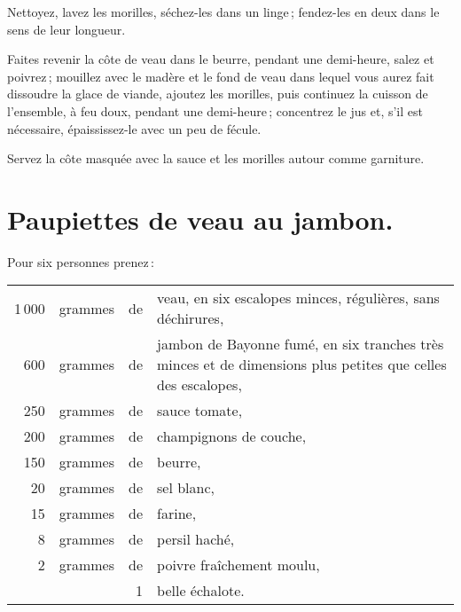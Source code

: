 Nettoyez, lavez les morilles, séchez-les dans un linge ; fendez-les en deux dans le
sens de leur longueur.

Faites revenir la côte de veau dans le beurre, pendant une demi-heure, salez et
poivrez ; mouillez avec le madère et le fond de veau dans lequel vous aurez
fait dissoudre la glace de viande, ajoutez les morilles, puis continuez la
cuisson de l'ensemble, à feu doux, pendant une demi-heure ; concentrez le jus
et, s'il est nécessaire, épaississez-le avec un peu de fécule.

Servez la côte masquée avec la sauce et les morilles autour comme garniture.

\section*{\centering Paupiettes de veau au jambon.}
{}

Pour six personnes prenez :

\medskip

\footnotesize
\begin{longtable}{rrrp{16em}}
  1 000 & grammes & de & veau, en six escalopes minces, régulières, sans déchirures,                      \\
    600 & grammes & de & jambon de Bayonne fumé, en six tranches très minces
                         et de dimensions plus petites que celles des escalopes,                          \\
    250 & grammes & de & sauce tomate,                                                                    \\
    200 & grammes & de & champignons de couche,                                                           \\
    150 & grammes & de & beurre,                                                                          \\
     20 & grammes & de & sel blanc,                                                                       \\
     15 & grammes & de & farine,                                                                          \\
      8 & grammes & de & persil haché,                                                                    \\
      2 & grammes & de & poivre fraîchement moulu,                                                        \\
        &         &  1 & belle échalote.                                                                  \\
\end{longtable}
\normalsize

